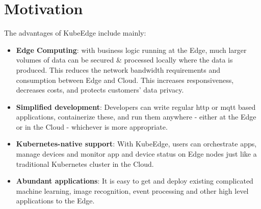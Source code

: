 \section{Motivation}
The advantages of KubeEdge include mainly:
\begin{itemize}
	\item \textbf{Edge Computing}: with business logic running at the Edge, much larger volumes of data can be secured \& processed locally where the data is produced. This reduces the network bandwidth requirements and consumption between Edge and Cloud. This increases responsiveness, decreases costs, and protects customers’ data privacy.
	\item \textbf{Simplified development}: Developers can write regular http or mqtt based applications, containerize these, and run them anywhere - either at the Edge or in the Cloud - whichever is more appropriate.
	\item \textbf{Kubernetes-native support}: With KubeEdge, users can orchestrate apps, manage devices and monitor app and device status on Edge nodes just like a traditional Kubernetes cluster in the Cloud.
	\item \textbf{Abundant applications}: It is easy to get and deploy existing complicated machine learning, image recognition, event processing and other high level applications to the Edge.
\end{itemize}


\clearpage
\thispagestyle{empty}
